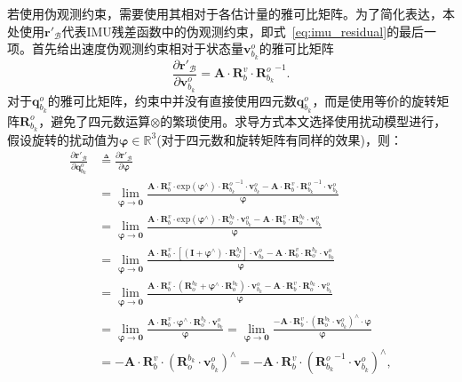若使用伪观测约束，需要使用其相对于各估计量的雅可比矩阵。为了简化表达，本处使用$\symbf{r}'_{\mathcal{B}}$代表IMU残差函数中的伪观测约束，即式~\eqref{eq:imu_residual}的最后一项。首先给出速度伪观测约束相对于状态量$\symbf{v}_{b_{k}}^o$的雅可比矩阵
\begin{equation}
  \frac{\partial \symbf{r}'_{\mathcal{B}}}{\partial \symbf{v}_{b_{k}}^o} = \symbf{A} \cdot \symbf{R}_b^v \cdot {\symbf{R}_{b_k}^o}^{-1}.
\label{eq:JrJv}
\end{equation}
对于$\symbf{q}_{b_{k}}^o$的雅可比矩阵，约束中并没有直接使用四元数$\symbf{q}_{b_{k}}^o$，而是使用等价的旋转矩阵$\symbf{R}_{b_{k}}^o$，避免了四元数运算$\otimes$的繁琐使用。求导方式本文选择使用扰动模型\cite{imu_preintegration}进行，假设旋转的扰动值为$\symbf{\varphi } \in \mathbb{R}^3$(对于四元数和旋转矩阵有同样的效果)，则：
\begin{align}
  \frac{\partial \symbf{r}'_{\mathcal{B}}}{\partial \symbf{q}_{b_{k}}^o} &\triangleq  \frac{\partial \symbf{r}'_{\mathcal{B}}}{\partial \symbf{\varphi }} \\
  &= \lim\limits_{\symbf{\varphi } \to \symbf{0}} \frac{\symbf{A} \cdot \symbf{R}_b^v \cdot {\text{exp}(\symbf{\varphi }^{\land}) \cdot {\symbf{R}_{b_k}^o}^{-1}} \cdot \symbf{v}_{b_k}^o - \symbf{A} \cdot \symbf{R}_b^v \cdot {{\symbf{R}_{b_k}^o}^{-1}} \cdot \symbf{v}_{b_k}^o}{\symbf{\varphi }} \\
  &= \lim\limits_{\symbf{\varphi } \to \symbf{0}} \frac{\symbf{A} \cdot \symbf{R}_b^v \cdot {\text{exp}(\symbf{\varphi }^{\land}) \cdot \symbf{R}^{b_k}_o} \cdot \symbf{v}_{b_k}^o - \symbf{A} \cdot \symbf{R}_b^v \cdot {\symbf{R}^{b_k}_o} \cdot \symbf{v}_{b_k}^o}{\symbf{\varphi }} \\
  &= \lim\limits_{\symbf{\varphi } \to \symbf{0}} \frac{\symbf{A} \cdot \symbf{R}_b^v \cdot {[(\symbf{I} + \symbf{\varphi }^{\land}) \cdot \symbf{R}^{b_k}_o]} \cdot \symbf{v}_{b_k}^o - \symbf{A} \cdot \symbf{R}_b^v \cdot {\symbf{R}^{b_k}_o} \cdot \symbf{v}_{b_k}^o}{\symbf{\varphi }} \\
  &= \lim\limits_{\symbf{\varphi } \to \symbf{0}} \frac{\symbf{A} \cdot \symbf{R}_b^v \cdot {({\symbf{R}^{b_k}_o} + \symbf{\varphi }^{\land} \cdot \symbf{R}^{b_k}_o)} \cdot \symbf{v}_{b_k}^o - \symbf{A} \cdot \symbf{R}_b^v \cdot {\symbf{R}^{b_k}_o} \cdot \symbf{v}_{b_k}^o}{\symbf{\varphi }} \\
  &= \lim\limits_{\symbf{\varphi } \to \symbf{0}} \frac{\symbf{A} \cdot \symbf{R}_b^v \cdot {\symbf{\varphi }^{\land} \cdot \symbf{R}^{b_k}_o} \cdot \symbf{v}_{b_k}^o}{\symbf{\varphi }}
  = \lim\limits_{\symbf{\varphi } \to \symbf{0}} \frac{-\symbf{A} \cdot \symbf{R}_b^v \cdot ({\symbf{R}^{b_k}_o} \cdot \symbf{v}_{b_k}^{o})^{\land} \cdot \symbf{\varphi}}{\symbf{\varphi }} \\
  &= -\symbf{A} \cdot \symbf{R}_b^v \cdot ({\symbf{R}^{b_k}_o} \cdot \symbf{v}_{b_k}^{o})^{\land}
  = -\symbf{A} \cdot \symbf{R}_b^v \cdot ({\symbf{R}_{b_k}^o}^{-1} \cdot \symbf{v}_{b_k}^{o})^{\land}, \label{eq:JrJqb}
\end{align}
